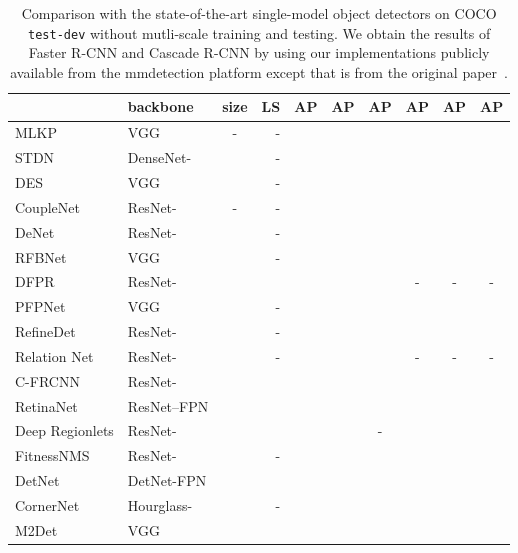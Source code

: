\documentclass[10pt,twocolumn,letterpaper]{article}
\begin{document}
\renewcommand{\arraystretch}{1.3}
    \begin{table*}[ht]
	\setlength{\tabcolsep}{9pt}
	\centering
	\caption{Comparison with the state-of-the-art single-model object detectors on COCO \texttt{test-dev} without mutli-scale training and testing.
	We obtain the results of Faster R-CNN and Cascade R-CNN
by using our implementations publicly
	available from the mmdetection platform\cite{mmdetection2018}
	except that 
	is from the original paper~\cite{CaiV18}.}
	\scriptsize
	\label{tab:recent_object_detection_results_single}
	\begin{tabular}{l|lcr|ccc|ccc}\hline \noalign{\smallskip}
    	 & backbone & size & LS & AP & AP & AP & AP & AP & AP\\

		\hline
		
		\hline
		MLKP \cite{WangWGLZ18} & VGG & - & - &   &  &  &  &  &  \\
		
		STDN \cite{ZhouNGHX18} & DenseNet- &  & - &  &  &  &  &  & \\
		
		DES \cite{ZhangQX0WY18} & VGG &   & - &  &  &  &  &  &  \\
		CoupleNet \cite{ZhuZWZWL17} & ResNet- & - & - &  &  &  &  &  &  \\
		DeNet \cite{Tychsen-SmithP17} & ResNet- &  & - &  &  &  &  &  &  \\
	    RFBNet \cite{LiuHW18} & VGG &  & -  &  &  &   &  &  &  \\
		DFPR \cite{KongSHL18} & ResNet- &  &  &  &  &  & - & - & - \\

	    PFPNet \cite{KimKSKK18} & VGG &  & - &  &  &   &  &  &  \\
	
	    RefineDet\cite{ZhangWBLL18} & ResNet- &  & - &  &  &  &  &  &   \\

	    Relation Net \cite{HuGZDW18} & ResNet- &  & - &  &  &  & - & - & - \\
	    C-FRCNN \cite{ChenHT18} & ResNet- &  &  &  &  &  &  &  &  \\
	    RetinaNet \cite{LinGGHD17} & ResNet--FPN &  &  &  &  &  &  &  &  \\

        Deep Regionlets \cite{XuLWRBC18} & ResNet- &  &   &  &  &  - &  &  &  \\
		
		FitnessNMS \cite{Tychsen-SmithP18} & ResNet- &  & - &  &  &  &  &  &  \\
        DetNet \cite{LiPYZDS18} & DetNet-FPN &  &  &  &  &  &  &  &  \\		
	    CornerNet \cite{LawD18} & Hourglass- &  & - &  &  &  &  &  &  \\
	    M2Det \cite{M2DETQ} & VGG &  &  &  &  &  &  &  &  \\
	

\end{tabular}
\end{table*}
\end{document}
